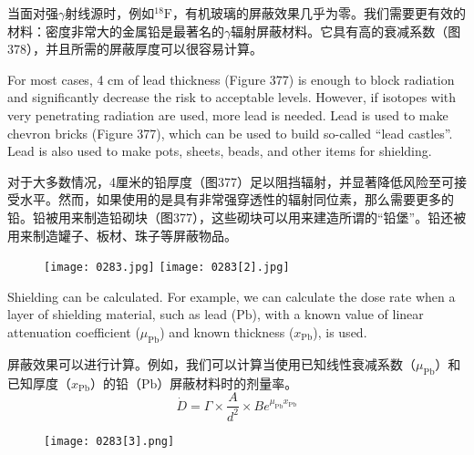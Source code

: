 \documentclass[dvipsnames, svgnames,a4paper,11pt]{article}
\begin{document}
当面对强$\gamma$射线源时，例如\(\mathrm{^{18}F}\)，有机玻璃的屏蔽效果几乎为零。我们需要更有效的材料：密度非常大的金属铅是最著名的$\gamma$辐射屏蔽材料。它具有高的衰减系数（图378），并且所需的屏蔽厚度可以很容易计算。


For most cases, 4 cm of lead thickness (Figure 377) is enough to block radiation and significantly decrease the risk to acceptable levels. However, if isotopes with very penetrating radiation are used, more lead is needed. Lead is used to make chevron bricks (Figure 377), which can be used to build so-called “lead castles”. Lead is also used to make pots, sheets, beads, and other items for shielding.

对于大多数情况，4厘米的铅厚度（图377）足以阻挡辐射，并显著降低风险至可接受水平。然而，如果使用的是具有非常强穿透性的辐射同位素，那么需要更多的铅。铅被用来制造铅砌块（图377），这些砌块可以用来建造所谓的“铅堡”。铅还被用来制造罐子、板材、珠子等屏蔽物品。

\begin{figure}[h]
    \centering
    \texttt{[image: 0283.jpg]} \hspace{0.1in}
    \texttt{[image: 0283[2].jpg]} \hspace{0.1in}
     \label{fig377}
\end{figure}

Shielding can be calculated. For example, we can calculate the dose rate when a layer of shielding material, such as lead (\(\mathrm{Pb}\)), with a known value of linear attenuation coefficient (\(\mu_{\mathrm{Pb}}\)) and known thickness (\(x_{\mathrm{Pb}}\)), is used.

屏蔽效果可以进行计算。例如，我们可以计算当使用已知线性衰减系数（\(\mu_{\mathrm{Pb}}\)）和已知厚度（\(x_{\mathrm{Pb}}\)）的铅（\(\mathrm{Pb}\)）屏蔽材料时的剂量率。
\[
\dot{D} = \Gamma \times \frac{A}{d^{2}}\times Be^{\mu_\mathrm{Pb}x_\mathrm{Pb}}
\]

\begin{figure}[h]
    \centering
    \texttt{[image: 0283[3].png]} 
     \label{fig378}
\end{figure}
\end{document}
